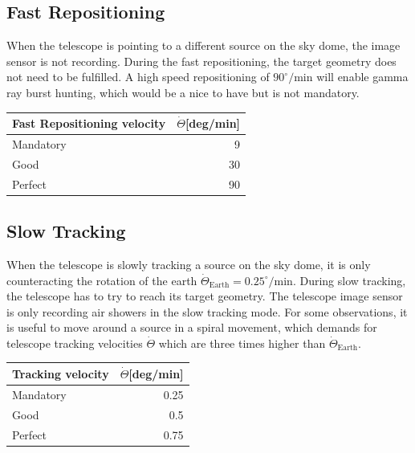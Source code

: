 \documentclass[11pt,a4paper,oneside,titlepage]{article}
\begin{document}
\subsection{Fast Repositioning}
%
When the telescope is pointing to a different source on the sky dome, the image sensor is not recording.
%
During the fast repositioning, the target geometry does not need to be fulfilled.
%
A high speed repositioning of $90^\circ/$min will enable gamma ray burst hunting, which would be a nice to have but is not mandatory.
%
\begin{table}[H]
    \begin{center}
        \begin{tabular}{lr}
            Fast Repositioning velocity & $\dot{\Theta}$[deg/min]\\
            \toprule
            Mandatory & 9\\
            Good      & 30\\
            Perfect   & 90\\
            \bottomrule
        \end{tabular}
    \end{center}
\end{table}
\subsection{Slow Tracking}
%
When the telescope is slowly tracking a source on the sky dome, it is only counteracting the rotation of the earth \mbox{$\dot{\Theta}_\text{Earth} = 0.25^\circ/$min}.
%
During slow tracking, the telescope has to try to reach its target geometry.
%
The telescope image sensor is only recording air showers in the slow tracking mode.
%
For some observations, it is useful to move around a source in a spiral movement, which demands for telescope tracking velocities $\dot{\Theta}$ which are three times higher than $\dot{\Theta}_\text{Earth}$.
%
\begin{table}[H]
    \begin{center}
        \begin{tabular}{lr}
            Tracking velocity & $\dot{\Theta}$[deg/min]\\
            \toprule
            Mandatory & 0.25\\
            Good      & 0.5\\
            Perfect   & 0.75\\
            \bottomrule
        \end{tabular}
    \end{center}
\end{table}
\end{document}

